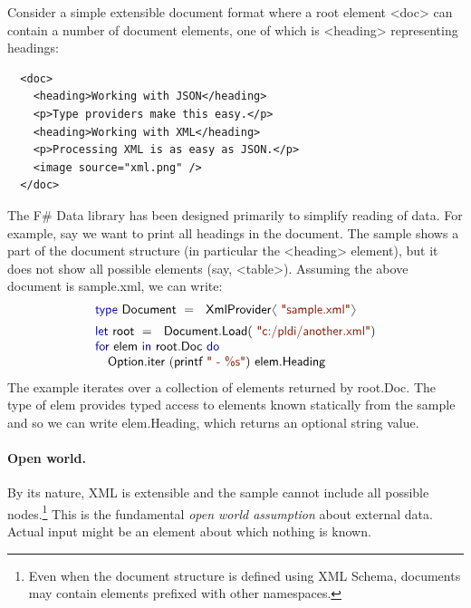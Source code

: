 \documentclass[10pt,preprint,clearpagebib]{sigplanconf}
\newcommand{\langl}{\begin{picture}(4.5,7)
\put(1.1,2.5){\rotatebox{60}{\line(1,0){5.5}}}
\put(1.1,2.5){\rotatebox{300}{\line(1,0){5.5}}}
\end{picture}}
\newcommand{\rangl}{\begin{picture}(4.5,7)
\put(.9,2.5){\rotatebox{120}{\line(1,0){5.5}}}
\put(.9,2.5){\rotatebox{240}{\line(1,0){5.5}}}
\end{picture}}
\newcommand{\kvd}[1]{\textnormal{\textcolor{kvdclr}{\sffamily #1}}}
\newcommand{\str}[1]{\textnormal{\textcolor{strclr}{\sffamily "#1"}}}
\newcommand{\strf}[1]{\textnormal{\textcolor{strclr}{\sffamily #1}}}
\newcommand{\ident}[1]{\textnormal{\sffamily #1}}
\begin{document}
Consider a simple extensible document format where a root element {\ttfamily\small <doc>} can 
contain a number of document elements, one of which is {\ttfamily\small <heading>} representing 
headings:
%
{\small{
\begin{verbatim}
  <doc>
    <heading>Working with JSON</heading>
    <p>Type providers make this easy.</p>
    <heading>Working with XML</heading>
    <p>Processing XML is as easy as JSON.</p>
    <image source="xml.png" />
  </doc>
\end{verbatim}
}}
%
\noindent
The F\# Data library has been designed primarily to simplify reading of data. For example,
say we want to print all headings in the document. The sample shows a part of the document structure 
(in particular the {\ttfamily\small <heading>} element), but it does not show all possible elements 
(say, {\ttfamily\small <table>}). Assuming the above document is \strf{sample.xml}, we can write:
%
\noindent
\begin{equation*}
\begin{array}{l}
 \kvd{type}~\ident{Document}~=~\ident{XmlProvider}\langl\str{sample.xml}\rangl\hspace{1em} \\[0.5em]
 \kvd{let}~\ident{root}~=~\ident{Document.Load}(\str{c:/pldi/another.xml})\\
 \kvd{for}~\ident{elem}~\kvd{in}~\ident{root.Doc}~\kvd{do}\\
 \quad\ident{Option.iter}~(\ident{printf}~\str{ - \%s})~\ident{elem.Heading}\\
\end{array}
\end{equation*}
%
The example iterates over a collection of elements returned by \ident{root.Doc}. The type of \ident{elem} 
provides typed access to elements known statically from the sample and so we can write \ident{elem.Heading}, 
which returns an optional string value.

\paragraph{Open world.}
By its nature, XML is extensible and the sample cannot include all possible nodes.\footnote{Even 
when the document structure is defined using XML Schema, documents may contain elements prefixed 
with other namespaces.} This is the fundamental \emph{open world assumption} about external data. 
Actual input might be an element about which nothing is known.
\end{document}
